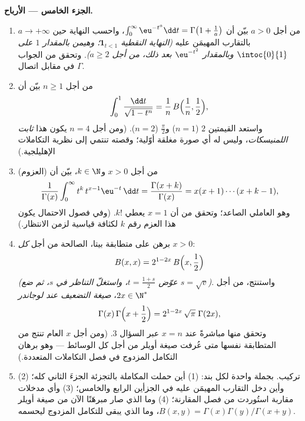 \begin{problem}
\medskip
\noindent\textbf{الجزء الخامس --- الأرباح.}
\begin{enumerate}[resume]
  \item من أجل $a > 0$ بيّن أن $\int_0^\infty \eu^{-t^a}\dd t =
        \Gamma\bigl(1 + \frac1a\bigr)$، واحسب النهاية حين
        $a \to +\infty$ بالتقارب المهيمَن عليه \emph{(النهاية
        النقطية $\mathbf 1_{t < 1}$؛ وهيمن بالمقدار $1$ على
        $\intoc{0}{1}$ وبالمقدار $\eu^{-t^2}$ بعد ذلك، من أجل $a \geq
        2$)}. وتحقق من الجواب في مقابل اتصال
        $\Gamma$.
  \item من أجل $n \geq 1$ بيّن أن
        \[
        \int_0^1 \frac{\dd t}{\sqrt{1 - t^n}}
        = \frac1n\,B\Bigl(\frac1n, \frac12\Bigr),
        \]
        واستعد القيمتين $2$ ($n = 1$) و$\frac\pi2$ ($n
        = 2$). (ومن أجل $n = 4$ يكون هذا \emph{ثابت
        اللمنيسكات}، وليس له أي صورة مغلقة أوّلية؛ وقصته
        تنتمي إلى نظرية التكاملات الإهليلجية.)
  \item (العزوم) من أجل $x > 0$ و$k \in \N$، بيّن أن
        \[
        \frac{1}{\Gamma(x)}\int_0^\infty
        t^{k}\,t^{x-1}\eu^{-t}\,\dd t
        = \frac{\Gamma(x+k)}{\Gamma(x)}
        = x(x+1)\cdots(x+k-1),
        \]
        وهو العاملي الصاعد؛ وتحقق من أن $x = 1$ يعطي $k!$. (وفي
        فصول الاحتمال يكون هذا العزم رقم $k$ لكثافة
        قياسية لزمن الانتظار.)
  \item برهن على متطابقة بيتا، الصالحة من أجل \emph{كل} $x > 0$:
        \[
        B(x, x) = 2^{1-2x}\,B\Bigl(x, \frac12\Bigr)
        \]
        \emph{(عوّض $t = \frac{1+s}2$، واستغلّ
        التناظر في $s$، ثم ضع $s = \sqrt v$)}. واستنتج، من أجل
        $2x \in \N^*$، \emph{صيغة التضعيف عند لوجاندر}
        \[
        \Gamma(x)\,\Gamma\Bigl(x + \frac12\Bigr)
        = 2^{1-2x}\,\sqrt\pi\;\Gamma(2x),
        \]
        وتحقق منها مباشرةً عند $x = n$ عبر السؤال 3. (ومن أجل
        $x$ العام تنتج من المتطابقة نفسها متى عُرفت
        صيغة أويلر من أجل كل الوسائط --- وهو برهان
        التكامل المزدوج في فصل التكاملات
        المتعددة.)
  \item تركيب. بجملة واحدة لكل بند: (1) أين حملت المكاملة
        بالتجزئة الجزءَ الثاني كله؛ (2) وأين دخل
        التقارب المهيمَن عليه في الجزأين الرابع والخامس؛ (3) وأي
        مدخلات مقاربة استُوردت من فصل المقارنة؛ (4) وما الذي
        صار مبرهَنًا الآن من صيغة أويلر
        $B(x,y) = \Gamma(x)\Gamma(y)/\Gamma(x+y)$، وما الذي
        يبقى للتكامل المزدوج ليحسمه.
\end{enumerate}
\end{problem}
